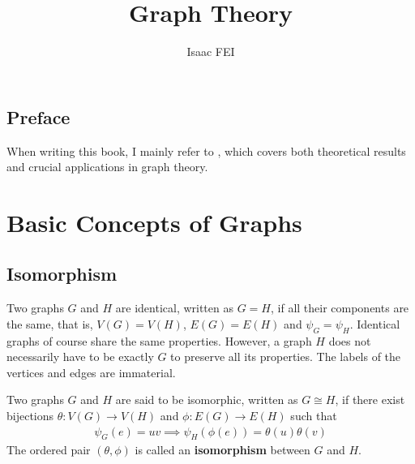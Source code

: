 \documentclass[thmcnt=section, 12pt, color=cyan]{my-elegantbook}
\title{Graph Theory}
\author{Isaac FEI}
\begin{document}
\maketitle


\frontmatter
\section*{Preface}

When writing this book, I mainly refer to \parencite{bondyGraphTheoryApplications1976}, which covers both theoretical results and crucial applications in graph theory. 


\tableofcontents
\mainmatter



\chapter{Basic Concepts of Graphs}


\section{Isomorphism}

Two graphs $G$ and $H$ are identical, written as $G = H$, if all their components are the same, that is, $V(G) = V(H)$, $E(G) = E(H)$ and $\psi_G = \psi_H$. Identical graphs of course share the same properties. However, a graph $H$ does not necessarily have to be exactly $G$ to preserve all its properties. The labels of the vertices and edges are immaterial.

\begin{definition}
    Two graphs $G$ and $H$ are said to be isomorphic, written as $G \cong H$, if there exist bijections $\theta: V(G) \to V(H)$ and $\phi: E(G) \to E(H)$ such that 
    \begin{align}
        \psi_G(e) = u v
        \implies \psi_H(\phi(e)) = \theta(u) \theta(v)
        \label{eq:1}
    \end{align}
    The ordered pair $(\theta, \phi)$ is called an \textbf{isomorphism} between $G$ and $H$.
\end{definition}
\end{document}
